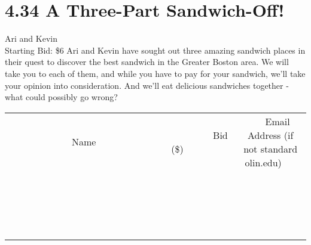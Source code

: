 \documentclass[11pt]{article}
\begin{document}
\section*{4.34 A Three-Part Sandwich-Off!}
Ari and Kevin
\\
Starting Bid: \$6
\newline
Ari and Kevin have sought out three amazing sandwich places in their quest to discover the best sandwich in the Greater Boston area. We will take you to each of them, and while you have to pay for your sandwich, we'll take your opinion into consideration. And we'll eat delicious sandwiches together - what could possibly go wrong?
\\[3ex]
\begin{tabular}{c c c}
~~~~~~~~~~~~~Name~~~~~~~~~~~~~ & ~~~~~~~~~Bid (\$)~~~~~~~~~  & ~~~Email Address (if not standard olin.edu)~~~\\
 & & \\
\hline
 & & \\
\hline
 & & \\
\hline
 & & \\
\hline
 & & \\
\hline
 & & \\
\hline
 & & \\
\hline
 & & \\
\hline
 & & \\
\hline
 & & \\
\hline
 & & \\
\hline
 & & \\
\hline
 & & \\
\hline
 & & \\
\hline
 & & \\
\hline
 & & \\
\hline
 & & \\
\hline
 & & \\
\hline
 & & \\
\hline
\end{tabular}
\newpage
\end{document}
